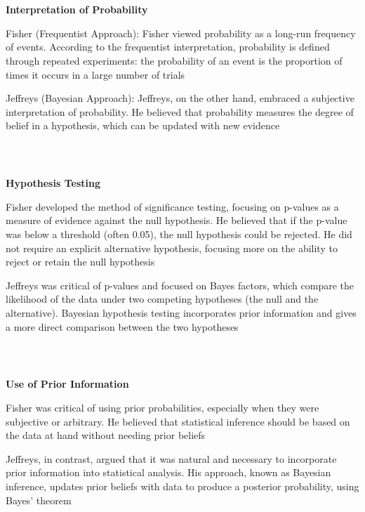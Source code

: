 \documentclass[notes,professionalfont,11pt,usenames,dvipsnames]{beamer}
\newcommand{\vs}{\bigskip}
\newcommand\justify{\rightskip0pt \leftskip0pt}
\newenvironment{slide}
{\begin{frame}[environment=slide]
\frametitle{\insertsection \\ \insertsubsection}\justify\setlength{\parskip}{0.5cm}\vspace{-1cm}}
{\end{frame}}
\begin{document}
\begin{slide}

{\color{red} \bf Interpretation of Probability}

Fisher (Frequentist Approach): Fisher viewed probability as a long-run frequency of events. According to the frequentist interpretation, probability is defined through repeated experiments: the probability of an event is the proportion of times it occurs in a large number of trials
   
\vs Jeffreys (Bayesian Approach): Jeffreys, on the other hand, embraced a subjective interpretation of probability. He believed that probability measures the degree of belief in a hypothesis, which can be updated with new evidence

\end{slide}

\begin{slide}

{\color{red} \bf Hypothesis Testing}

Fisher developed the method of significance testing, focusing on p-values as a measure of evidence against the null hypothesis. He believed that if the p-value was below a threshold (often 0.05), the null hypothesis could be rejected. He did not require an explicit alternative hypothesis, focusing more on the ability to reject or retain the null hypothesis

Jeffreys was critical of p-values and focused on Bayes factors, which compare the likelihood of the data under two competing hypotheses (the null and the alternative). Bayesian hypothesis testing incorporates prior information and gives a more direct comparison between the two hypotheses

\end{slide}

\begin{slide}

{\color{red} \bf Use of Prior Information}

Fisher was critical of using prior probabilities, especially when they were subjective or arbitrary. He believed that statistical inference should be based on the data at hand without needing prior beliefs

\vs Jeffreys, in contrast, argued that it was natural and necessary to incorporate prior information into statistical analysis. His approach, known as Bayesian inference, updates prior beliefs with data to produce a posterior probability, using Bayes' theorem


\end{slide}
\end{document}
